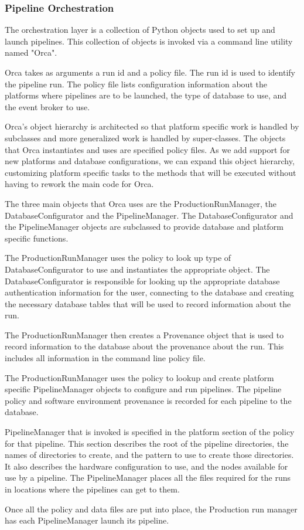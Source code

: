 
\subsubsection{Pipeline Orchestration}
\label{sec:PipelineOrchestration}

The orchestration layer is a collection of Python objects used to set up and
launch pipelines. This collection of objects is invoked via a command line 
utility named "Orca".

Orca takes as arguments a run id and a policy file. The run id is used to
identify the pipeline run. The policy file lists configuration information
about the platforms where pipelines are to be launched, the type of database
to use, and the event broker to use.

Orca's object hierarchy is architected so that platform specific work is 
handled by subclasses and more generalized work is handled by super-classes. 
The objects that Orca instantiates and uses are specified policy files.   As
we add support for new platforms and database configurations, we can expand
this object hierarchy, customizing platform specific tasks to the methods that
will be executed without having to rework the main code for Orca.

The three main objects that Orca uses are the ProductionRunManager, the 
DatabaseConfigurator and the PipelineManager.  The DatabaseConfigurator and
the PipelineManager objects are subclassed to provide database and platform
specific functions.

The ProductionRunManager uses the policy to look up type of 
DatabaseConfigurator to use and instantiates the appropriate object. The
DatabaseConfigurator is responsible for looking up the appropriate database 
authentication information for the user, connecting to the database and
creating the necessary database tables that will be used to record
information about the run.

The ProductionRunManager then creates a Provenance object that is used to
record information to the database about the provenance about the run. This
includes all information in the command line policy file.  

The ProductionRunManager uses the policy to lookup and create platform
specific PipelineManager objects to configure and run pipelines. The pipeline
policy and software environment provenance is recorded for each pipeline to
the database.   

PipelineManager that is invoked is specified in the platform section of the
policy for that pipeline.   This section describes the root of the pipeline
directories, the names of directories to create, and the pattern to use to 
create those directories.  It also describes the hardware configuration to
use, and the nodes available for use by a pipeline. The PipelineManager 
places all the files required for the runs in locations where the pipelines
can get to them.

Once all the policy and data files are put into place, the Production run 
manager has each PipelineManager launch its pipeline.
